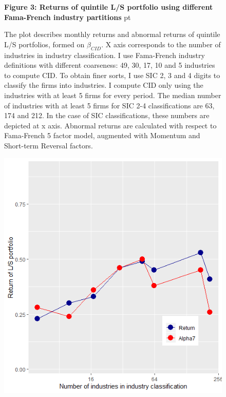 \documentclass[12pt]{article}
\begin{document}
\begin{figure}
\textbf{Figure 3: Returns of quintile L/S portfolio using different Fama-French industry partitions}
 pt
\begin{flushleft}
{The plot describes monthly returns and abnormal returns of quintile L/S portfolios, formed on $\beta_{CID}$. X axis corresponds to the number of industries in industry classification. I use Fama-French industry definitions with different coarseness: 49, 30, 17, 10 and 5 industries to compute CID. To obtain finer sorts, I use SIC 2, 3 and 4 digits to classify the firms into industries. I compute CID only using the industries with at least 5 firms for every period. The median number of industries with at least 5 firms for SIC 2-4 classifications are 63, 174 and 212. In the case of SIC classifications, these numbers are depicted at x axis.  Abnormal returns are calculated with respect to Fama-French 5 factor model, augmented with Momentum and Short-term Reversal factors.}
\end{flushleft}
\centering
\includegraphics[width=1\textwidth]{Figure3.png}
\end{figure}
\end{document}
